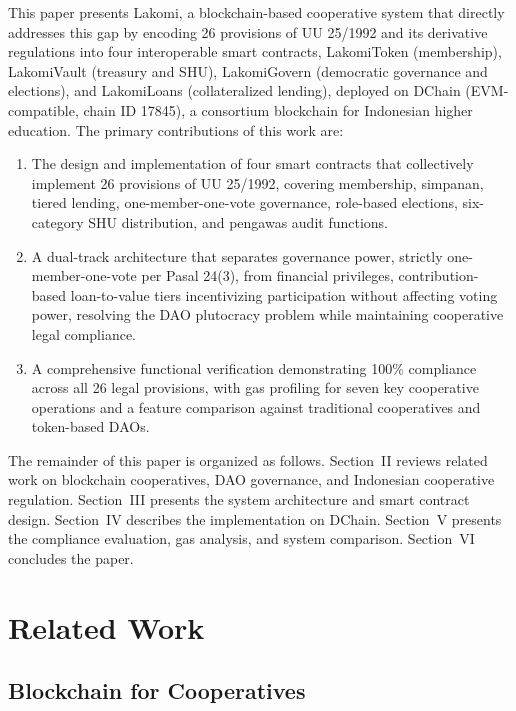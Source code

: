 \documentclass[conference]{IEEEtran}
\begin{document}
This paper presents Lakomi, a blockchain-based cooperative system that directly addresses this gap by encoding 26 provisions of UU 25/1992 and its derivative regulations into four interoperable smart contracts, LakomiToken (membership), LakomiVault (treasury and SHU), LakomiGovern (democratic governance and elections), and LakomiLoans (collateralized lending), deployed on DChain (EVM-compatible, chain ID 17845), a consortium blockchain for Indonesian higher education. The primary contributions of this work are:

\begin{enumerate}
    \item The design and implementation of four smart contracts that collectively implement 26 provisions of UU 25/1992, covering membership, simpanan, tiered lending, one-member-one-vote governance, role-based elections, six-category SHU distribution, and pengawas audit functions.
    \item A dual-track architecture that separates governance power, strictly one-member-one-vote per Pasal 24(3), from financial privileges, contribution-based loan-to-value tiers incentivizing participation without affecting voting power, resolving the DAO plutocracy problem while maintaining cooperative legal compliance.
    \item A comprehensive functional verification demonstrating 100\% compliance across all 26 legal provisions, with gas profiling for seven key cooperative operations and a feature comparison against traditional cooperatives and token-based DAOs.
\end{enumerate}

The remainder of this paper is organized as follows. Section~II reviews related work on blockchain cooperatives, DAO governance, and Indonesian cooperative regulation. Section~III presents the system architecture and smart contract design. Section~IV describes the implementation on DChain. Section~V presents the compliance evaluation, gas analysis, and system comparison. Section~VI concludes the paper.

\section{Related Work}

\subsection{Blockchain for Cooperatives}
\end{document}
